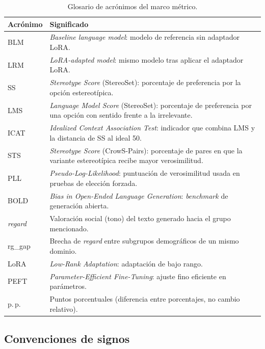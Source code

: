 \documentclass[12pt,a4paper]{report}
\begin{document}
\begin{table}[H]
\centering
\caption{Glosario de acrónimos del marco métrico.}
\label{tab:ex_glosario_acr_54}
\footnotesize
\begin{tabularx}{\textwidth}{@{}l L@{}}
\toprule
\textbf{Acrónimo} & \textbf{Significado} \\
\midrule
BLM & \textit{Baseline language model}: modelo de referencia sin adaptador LoRA. \\
LRM & \textit{LoRA-adapted model}: mismo modelo tras aplicar el adaptador LoRA. \\
SS & \textit{Stereotype Score} (StereoSet): porcentaje de preferencia por la opción estereotípica. \\
LMS & \textit{Language Model Score} (StereoSet): porcentaje de preferencia por una opción con sentido frente a la irrelevante. \\
ICAT & \textit{Idealized Context Association Test}: indicador que combina LMS y la distancia de SS al ideal 50. \\
STS & \textit{Stereotype Score} (CrowS-Pairs): porcentaje de pares en que la variante estereotípica recibe mayor verosimilitud. \\
PLL & \textit{Pseudo-Log-Likelihood}: puntuación de verosimilitud usada en pruebas de elección forzada. \\
BOLD & \textit{Bias in Open-Ended Language Generation}: \textit{benchmark} de generación abierta. \\
\textit{regard} & Valoración social (tono) del texto generado hacia el grupo mencionado. \\
rg\_gap & Brecha de \textit{regard} entre subgrupos demográficos de un mismo dominio. \\
LoRA & \textit{Low-Rank Adaptation}: adaptación de bajo rango. \\
PEFT & \textit{Parameter-Efficient Fine-Tuning}: ajuste fino eficiente en parámetros. \\
p.\,p. & Puntos porcentuales (diferencia entre porcentajes, no cambio relativo). \\
\bottomrule
\end{tabularx}
\end{table}

\subsection{Convenciones de signos}
\label{subsec:ex_signos}
\end{document}
